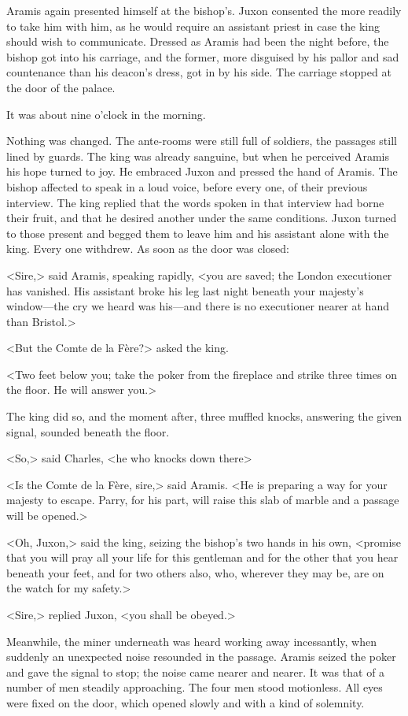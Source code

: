 Aramis again presented himself at the bishop's. Juxon consented the more readily to take him with him, as he would require an assistant priest in case the king should wish to communicate. Dressed as Aramis had been the night before, the bishop got into his carriage, and the former, more disguised by his pallor and sad countenance than his deacon's dress, got in by his side. The carriage stopped at the door of the palace.

It was about nine o'clock in the morning.

Nothing was changed. The ante-rooms were still full of soldiers, the passages still lined by guards. The king was already sanguine, but when he perceived Aramis his hope turned to joy. He embraced Juxon and pressed the hand of Aramis. The bishop affected to speak in a loud voice, before every one, of their previous interview. The king replied that the words spoken in that interview had borne their fruit, and that he desired another under the same conditions. Juxon turned to those present and begged them to leave him and his assistant alone with the king. Every one withdrew. As soon as the door was closed:

<Sire,> said Aramis, speaking rapidly, <you are saved; the London executioner has vanished. His assistant broke his leg last night beneath your majesty's window—the cry we heard was his—and there is no executioner nearer at hand than Bristol.>

<But the Comte de la Fère?> asked the king.

<Two feet below you; take the poker from the fireplace and strike three times on the floor. He will answer you.>

The king did so, and the moment after, three muffled knocks, answering the given signal, sounded beneath the floor.

<So,> said Charles, <he who knocks down there\longdash>

<Is the Comte de la Fère, sire,> said Aramis. <He is preparing a way for your majesty to escape. Parry, for his part, will raise this slab of marble and a passage will be opened.>

<Oh, Juxon,> said the king, seizing the bishop's two hands in his own, <promise that you will pray all your life for this gentleman and for the other that you hear beneath your feet, and for two others also, who, wherever they may be, are on the watch for my safety.>

<Sire,> replied Juxon, <you shall be obeyed.>

Meanwhile, the miner underneath was heard working away incessantly, when suddenly an unexpected noise resounded in the passage. Aramis seized the poker and gave the signal to stop; the noise came nearer and nearer. It was that of a number of men steadily approaching. The four men stood motionless. All eyes were fixed on the door, which opened slowly and with a kind of solemnity.

